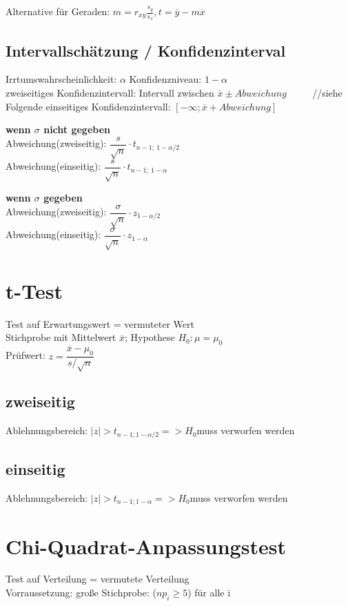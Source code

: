 Alternative für Geraden: $m= r_{xy}\frac{s_y}{s_x}, t = \overline{y}-m\overline{x}$

\subsection*{Intervallschätzung / Konfidenzinterval}
Irrtumswahrscheinlichkeit: $\alpha$ 
Konfidenzniveau: $1-\alpha$\\

zweiseitiges Konfidenzintervall: Intervall zwischen $\overline{x} \pm Abweichung$ ~~~~ //siehe Folgende
einseitiges Konfidenzintervall: $[-\infty; \overline{x} + Abweichung]$

\textbf{wenn $\sigma$ nicht gegeben }\\
Abweichung(zweiseitig): $\dfrac{s}{\sqrt{n}} \cdot t_{n-1;~ 1-\alpha/2}$\\
Abweichung(einseitig): $\dfrac{s}{\sqrt{n}} \cdot t_{n-1;~ 1-\alpha}$

\textbf{wenn $\sigma$ gegeben}\\
Abweichung(zweiseitig): $\dfrac{\sigma}{\sqrt{n}}\cdot  z_{1-\alpha/2}$\\
Abweichung(einseitig): $\dfrac{\sigma}{\sqrt{n}} \cdot z_{1-\alpha}$


\section*{t-Test}
Test auf Erwartungswert = vermuteter Wert \\
Stichprobe mit Mittelwert $\overline{x}$; Hypothese $H_0: \mu = \mu_0$\\
Prüfwert: $z= \dfrac{\overline{x} - \mu_0}{s/\sqrt{n}}$

\subsection*{zweiseitig}
Ablehnungsbereich: $|z| > t_{n-1;1-\alpha/2} => H_0 $muss verworfen werden 
\subsection*{einseitig}
Ablehnungsbereich: $|z| > t_{n-1;1-\alpha} => H_0 $muss verworfen werden 


\section*{Chi-Quadrat-Anpassungstest}
Test auf Verteilung = vermutete Verteilung\\
Vorraussetzung: große Stichprobe: ($np_i \geq 5$) für alle i

